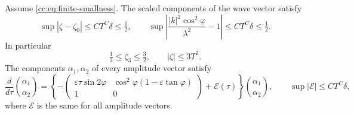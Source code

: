 \begin{lemma}\label{cc:uf:exact:lem:additive}
Assume \eqref{cc:eq:finite-smallness}. The scaled components of the wave
vector satisfy
\begin{equation}\label{cc:eq:wave-vector-comparison}
 \sup|\zeta-\zeta_0|\le CT^C\delta\le\tfrac12,\qquad
 \sup\left|\frac{|k|^2\cos^2\varphi}{\lambda^2}-1\right|
       \le CT^C\delta\le\tfrac12.
\end{equation}
In particular
\begin{equation}\label{cc:eq:zeta-bounds}
 \tfrac12\le\zeta_3\le\tfrac32,\qquad |\zeta|\le3T^2 .
\end{equation}
The components $\alpha_1,\alpha_2$ of every amplitude vector satisfy
\[
 \frac{d}{d\tau}\binom{\alpha_1}{\alpha_2}
 =\left\{-\begin{pmatrix}
 \varepsilon\tau\sin2\varphi&\cos^2\varphi(1-\varepsilon\tan\varphi)\\
 1&0
 \end{pmatrix}+\mathcal E(\tau)\right\}\binom{\alpha_1}{\alpha_2},
 \qquad \sup|\mathcal E|\le CT^C\delta,
\]
where $\mathcal E$ is the same for all amplitude vectors.
\end{lemma}
